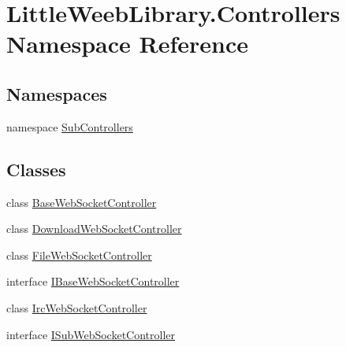 \hypertarget{namespace_little_weeb_library_1_1_controllers}{}\section{Little\+Weeb\+Library.\+Controllers Namespace Reference}
\label{namespace_little_weeb_library_1_1_controllers}
\subsection*{Namespaces}
\begin{DoxyCompactItemize}
\item 
namespace \mbox{\hyperlink{namespace_little_weeb_library_1_1_controllers_1_1_sub_controllers}{Sub\+Controllers}}
\end{DoxyCompactItemize}
\subsection*{Classes}
\begin{DoxyCompactItemize}
\item 
class \mbox{\hyperlink{class_little_weeb_library_1_1_controllers_1_1_base_web_socket_controller}{Base\+Web\+Socket\+Controller}}
\item 
class \mbox{\hyperlink{class_little_weeb_library_1_1_controllers_1_1_download_web_socket_controller}{Download\+Web\+Socket\+Controller}}
\item 
class \mbox{\hyperlink{class_little_weeb_library_1_1_controllers_1_1_file_web_socket_controller}{File\+Web\+Socket\+Controller}}
\item 
interface \mbox{\hyperlink{interface_little_weeb_library_1_1_controllers_1_1_i_base_web_socket_controller}{I\+Base\+Web\+Socket\+Controller}}
\item 
class \mbox{\hyperlink{class_little_weeb_library_1_1_controllers_1_1_irc_web_socket_controller}{Irc\+Web\+Socket\+Controller}}
\item 
interface \mbox{\hyperlink{interface_little_weeb_library_1_1_controllers_1_1_i_sub_web_socket_controller}{I\+Sub\+Web\+Socket\+Controller}}
\end{DoxyCompactItemize}
